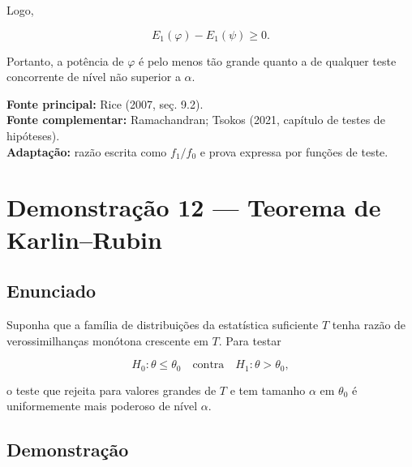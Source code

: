 \documentclass[
  letterpaper,
  DIV=11,
  numbers=noendperiod]{scrreprt}
\begin{document}
Logo,

\[
E_1(\varphi)-E_1(\psi)
\geq 0.
\]

Portanto, a potência de \(\varphi\) é pelo menos tão grande quanto a de
qualquer teste concorrente de nível não superior a \(\alpha\).

\begin{tcolorbox}[enhanced jigsaw, colback=white, leftrule=.75mm, colbacktitle=quarto-callout-note-color!10!white, breakable, titlerule=0mm, bottomtitle=1mm, title=\textcolor{quarto-callout-note-color}{\faInfo}\hspace{0.5em}{Fonte da demonstração}, colframe=quarto-callout-note-color-frame, toprule=.15mm, opacityback=0, bottomrule=.15mm, opacitybacktitle=0.6, arc=.35mm, toptitle=1mm, rightrule=.15mm, coltitle=black, left=2mm]

\textbf{Fonte principal:} Rice (2007, seç. 9.2).\\
\textbf{Fonte complementar:} Ramachandran; Tsokos (2021, capítulo de
testes de hipóteses).\\
\textbf{Adaptação:} razão escrita como \(f_1/f_0\) e prova expressa por
funções de teste.

\end{tcolorbox}

\section*{Demonstração 12 --- Teorema de
Karlin--Rubin}\label{demonstrauxe7uxe3o-12-teorema-de-karlinrubin}


\subsection*{Enunciado}\label{enunciado-17}

Suponha que a família de distribuições da estatística suficiente \(T\)
tenha razão de verossimilhanças monótona crescente em \(T\). Para testar

\[
H_0:\theta\leq\theta_0
\quad\text{contra}\quad
H_1:\theta>\theta_0,
\]

o teste que rejeita para valores grandes de \(T\) e tem tamanho
\(\alpha\) em \(\theta_0\) é uniformemente mais poderoso de nível
\(\alpha\).

\subsection*{Demonstração}\label{demonstrauxe7uxe3o-18}
\end{document}
